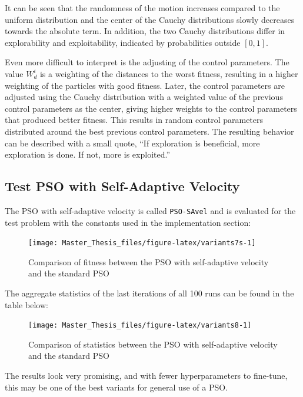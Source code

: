 \documentclass[
  oneside, a4paper, 12pt, openany]{book}
\theoremstyle{definition}
\theoremstyle{definition}
\theoremstyle{definition}
\theoremstyle{definition}
\theoremstyle{remark}
\begin{document}
It can be seen that the randomness of the motion increases compared to the uniform distribution and the center of the Cauchy distributions slowly decreases towards the absolute term. In addition, the two Cauchy distributions differ in explorability and exploitability, indicated by probabilities outside \([0, 1]\).

Even more difficult to interpret is the adjusting of the control parameters. The value \(W_d^i\) is a weighting of the distances to the worst fitness, resulting in a higher weighting of the particles with good fitness. Later, the control parameters are adjusted using the Cauchy distribution with a weighted value of the previous control parameters as the center, giving higher weights to the control parameters that produced better fitness. This results in random control parameters distributed around the best previous control parameters. The resulting behavior can be described with a small quote, ``If exploration is beneficial, more exploration is done. If not, more is exploited.''

\hypertarget{test-pso-with-self-adaptive-velocity}{%
\subsection{Test PSO with Self-Adaptive Velocity}\label{test-pso-with-self-adaptive-velocity}}

The PSO with self-adaptive velocity is called \texttt{PSO-SAvel} and is evaluated for the test problem with the constants used in the implementation section:

\begin{figure}[H]
\texttt{[image: Master\_Thesis\_files/figure-latex/variants7s-1]} \caption{Comparison of fitness between the PSO with self-adaptive velocity and the standard PSO}\label{fig:variants7s}
\end{figure}

The aggregate statistics of the last iterations of all 100 runs can be found in the table below:

\begin{figure}[H]
\texttt{[image: Master\_Thesis\_files/figure-latex/variants8-1]} \caption{Comparison of statistics between the PSO with self-adaptive velocity and the standard PSO}\label{fig:variants8}
\end{figure}

\vspace{-0.1cm}

The results look very promising, and with fewer hyperparameters to fine-tune, this may be one of the best variants for general use of a PSO.
\end{document}
